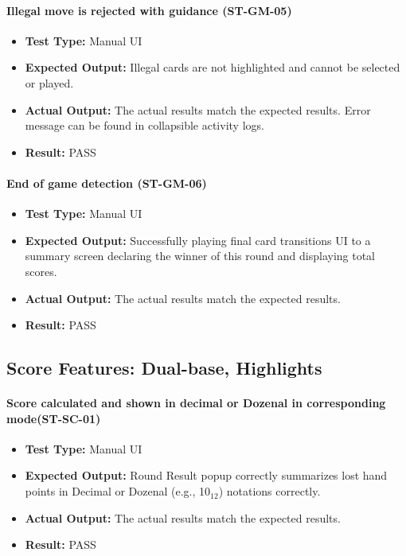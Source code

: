 \documentclass[12pt, titlepage]{article}
\begin{document}
\paragraph{Illegal move is rejected with guidance (ST-GM-05)}
\begin{itemize}
  \item \textbf{Test Type:} Manual UI
  \item \textbf{Expected Output:} Illegal cards are not highlighted and cannot be selected or played. 
  \item \textbf{Actual Output:} The actual results match the expected results. Error message can be found in collapsible activity logs.
  \item \textbf{Result:} PASS
\end{itemize}

\paragraph{End of game detection (ST-GM-06)}
\begin{itemize}
  \item \textbf{Test Type:} Manual UI
  \item \textbf{Expected Output:} Successfully playing final card transitions UI to a summary screen declaring the winner of this round and displaying total scores.
  \item \textbf{Actual Output:} The actual results match the expected results.
  \item \textbf{Result:} PASS
\end{itemize}


\subsection{Score Features: Dual-base, Highlights }

\paragraph{Score calculated and shown in decimal or Dozenal in corresponding mode(ST-SC-01)}
\begin{itemize}
  \item \textbf{Test Type:} Manual UI
  \item \textbf{Expected Output:} Round Result popup correctly summarizes lost hand points in Decimal or Dozenal (e.g., 10$_{12}$) notations correctly.
  \item \textbf{Actual Output:} The actual results match the expected results.
  \item \textbf{Result:} PASS
\end{itemize}
\end{document}
